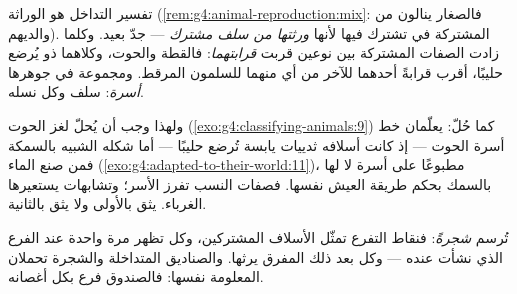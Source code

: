 \begin{proposition}\label{prop:g6:classification-kinship:kinship}
تفسير التداخل هو الوراثة
(\cref{rem:g4:animal-reproduction:mix}: فالصغار ينالون من
والديهم).  المشتركة في  تشترك فيها لأنها
\emph{ورثتها من سلف مشترك} ---  جدّ بعيد. وكلما زادت الصفات
المشتركة بين نوعين قربت \emph{قرابتهما}: فالقطة
والحوت، وكلاهما ذو  يُرضع حليبًا، أقرب قرابةً أحدهما للآخر من
 أي منهما للسلمون المرقط. ومجموعة  في جوهرها
\emph{أسرة}: سلف وكل نسله.
\end{proposition}
\admitted

\begin{example}\label{ex:g6:classification-kinship:whale}
ولهذا وجب أن يُحلّ لغز الحوت
(\cref{exo:g4:classifying-animals:9}) كما حُلّ:  
يعلّمان خط أسرة الحوت --- إذ كانت أسلافه ثدييات يابسة تُرضع
حليبًا --- أما شكله الشبيه بالسمكة فمن صنع الماء
(\cref{exo:g4:adapted-to-their-world:11})، مطبوعًا على أسرة لا
 لها بالسمك بحكم طريقة العيش نفسها. فصفات النسب تفرز الأسر؛
وتشابهات  يستعيرها الغرباء.  يثق بالأولى ولا يثق
بالثانية.
\end{example}

\begin{definition}\label{def:g6:classification-kinship:tree}
تُرسم  \emph{شجرةً}: فنقاط التفرع تمثّل
الأسلاف المشتركين، وكل  تظهر مرة واحدة عند الفرع الذي نشأت
عنده --- وكل  بعد ذلك المفرق يرثها. والصناديق المتداخلة والشجرة
تحملان المعلومة نفسها: فالصندوق فرع بكل أغصانه.
\end{definition}

